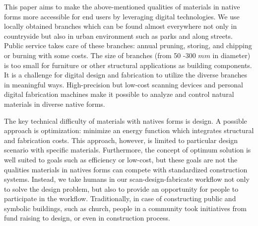 This paper aims to make the above-mentioned qualities of materials in native forms more accessible for end users by leveraging digital technologies.
We use locally obtained branches which can be found almost everywhere not only in countryside but also in urban environment such as parks and along streets.
Public service takes care of these branches: annual pruning, storing, and chipping or burning with some costs.
The size of branches (from 50 -300 $mm$ in diameter) is too small for furniture or other structural applications as building components.
It is a challenge for digital design and fabrication to utilize the diverse branches in meaningful ways.
High-precision but low-cost scanning devices and personal digital fabrication machines make it possible to analyze and control natural materials in diverse native forms.

The key technical difficulty of materials with natives forms is design.
A possible approach is optimization: minimize an energy function which integrates structural and fabrication costs.
This approach, however, is limited to particular design scenario with specific materials.
Furthermore, the concept of optimum solution is well suited to goals such as efficiency or low-cost, but these goals are not the qualities materials in natives forms can compete with standardized construction systems.
Instead, we take humans in our scan-design-fabricate workflow not only to solve the design problem, but also to provide an opportunity for people to participate in the workflow.
Traditionally, in case of constructing public and symbolic buildings, such as church, people in a community took initiatives from fund raising to design, or even in construction process.




